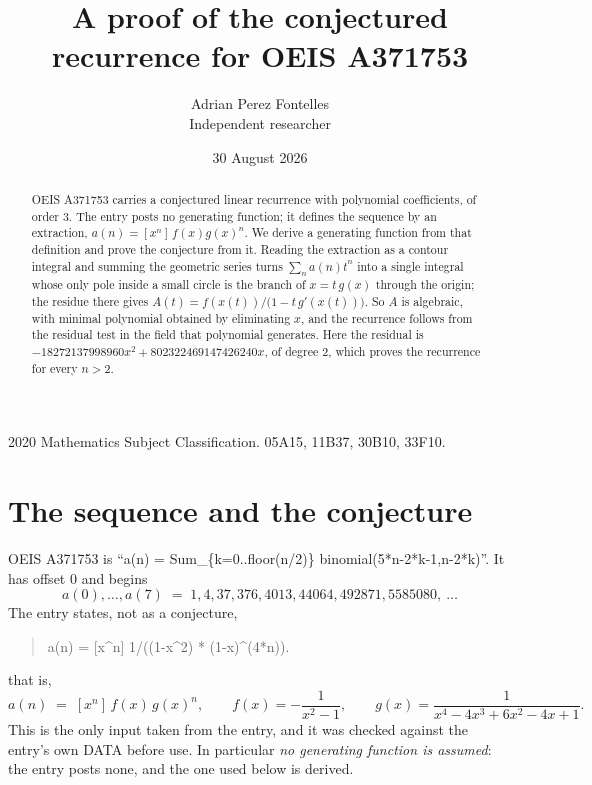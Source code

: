 \documentclass[11pt,a4paper]{article}
\title{A proof of the conjectured recurrence for OEIS A371753}
\author{Adrian Perez Fontelles\\ \small Independent researcher}
\date{30 August 2026}
\theoremstyle{plain}
\theoremstyle{definition}
\begin{document}
\maketitle

\begin{abstract}
OEIS A371753 carries a conjectured linear recurrence with polynomial coefficients, of
order 3. The entry posts no generating function; it defines the sequence by an
extraction, $a(n)=[x^{n}]\,f(x)g(x)^{n}$. We derive a generating function from that
definition and prove the conjecture from it. Reading the extraction as a contour integral
and summing the geometric series turns $\sum_{n}a(n)t^{n}$ into a single integral whose
only pole inside a small circle is the branch of $x=t\,g(x)$ through the origin; the
residue there gives $A(t)=f(x(t))/\bigl(1-t\,g'(x(t))\bigr)$. So $A$ is algebraic, with
minimal polynomial obtained by eliminating $x$, and the recurrence follows from the
residual test in the field that polynomial generates. Here the residual is
$- 18272137998960 x^{2} + 802322469147426240 x$, of degree $2$, which proves the recurrence for every $n>2$.
\end{abstract}

\noindent\small 2020 Mathematics Subject Classification. 05A15, 11B37, 30B10, 33F10.\normalsize

\section{The sequence and the conjecture}

OEIS A371753 is ``a(n) = Sum\_\{k=0..floor(n/2)\} binomial(5*n-2*k-1,n-2*k)''. It has offset $0$ and begins
\[
a(0),\dots,a(7)\;=\;1, 4, 37, 376, 4013, 44064, 492871, 5585080,\ \dots
\]
The entry states, not as a conjecture,
\begin{quote}\small
a(n) = [x\^{}n] 1/((1-x\^{}2) * (1-x)\^{}(4*n)).
\end{quote}
that is,
\begin{equation}\label{eq:def}
a(n)\;=\;[x^{n}]\,f(x)\,g(x)^{n},
\qquad f(x)=- \frac{1}{x^{2} - 1},\qquad g(x)=\frac{1}{x^{4} - 4 x^{3} + 6 x^{2} - 4 x + 1} .
\end{equation}
This is the only input taken from the entry, and it was checked against the entry's own
DATA before use. In particular \emph{no generating function is assumed}: the entry posts
none, and the one used below is derived.
\end{document}
